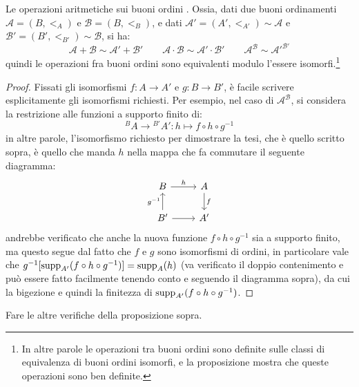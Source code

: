 \begin{proposition}
	Le operazioni aritmetiche sui buoni ordini . Ossia, dati due buoni ordinamenti $\mathcal A = (B,<_A)$
	e $\mathcal B = (B,<_B)$, e dati $\mathcal A' = (A',<_{A'}) \sim \mathcal A$ e $\mathcal{B}' = (B',<_{B'}) \sim \mathcal B$, si ha:
	\[ \mathcal{A} + \mathcal{B} \sim \mathcal{A}' + \mathcal{B'} \qquad \mathcal{A} \cdot \mathcal{B} \sim \mathcal{A}' \cdot \mathcal{B'} \qquad \mathcal{A}^{\mathcal{B}} \sim \mathcal{A}'^{\mathcal{B'}}
		\]
	quindi le operazioni fra buoni ordini sono equivalenti modulo l'essere isomorfi.\footnote{In altre parole le operazioni tra buoni ordini sono definite sulle classi di equivalenza di buoni ordini isomorfi, e la proposizione mostra che queste 
	operazioni sono ben definite.}
\end{proposition}

\begin{proof}
	Fissati gli isomorfismi $f : A \rightarrow A'$ e $g : B \rightarrow B'$, è facile scrivere esplicitamente gli isomorfismi richiesti. Per esempio, nel caso di $\mathcal{A}^{\mathcal{B}}$, si considera la restrizione alle funzioni a supporto finito di:
	\[ {}^{B}A \rightarrow {}^{B'}A' : h \mapsto f \circ h \circ g^{-1}
		\]
	in altre parole, l'isomorfismo richiesto per dimostrare la tesi, che è quello scritto sopra, è quello che manda $h$ nella mappa che fa commutare il seguente diagramma:
	\[\begin{tikzcd}
		B & A \\
		{B'} & {A'}
		\arrow["h", from=1-1, to=1-2]
		\arrow["{g^{-1}}", from=2-1, to=1-1]
		\arrow[from=2-1, to=2-2]
		\arrow["f", from=1-2, to=2-2]
	\end{tikzcd}\]
	andrebbe verificato che anche la nuova funzione $f \circ h \circ g^{-1}$ sia a supporto finito, ma questo segue dal fatto che $f$ e $g$ sono isomorfismi di ordini,
	in particolare vale che $g^{-1}[\operatorname{supp}_{A'}(f \circ h \circ g^{-1})] = \operatorname{supp}_A(h)$ (va verificato il doppio contenimento e può essere fatto facilmente tenendo conto e seguendo il diagramma sopra),
	da cui la bigezione e quindi la finitezza di $\operatorname{supp}_{A'}(f \circ h \circ g^{-1})$.
\end{proof}

\begin{exercise}
	Fare le altre verifiche della proposizione sopra.
\end{exercise}

